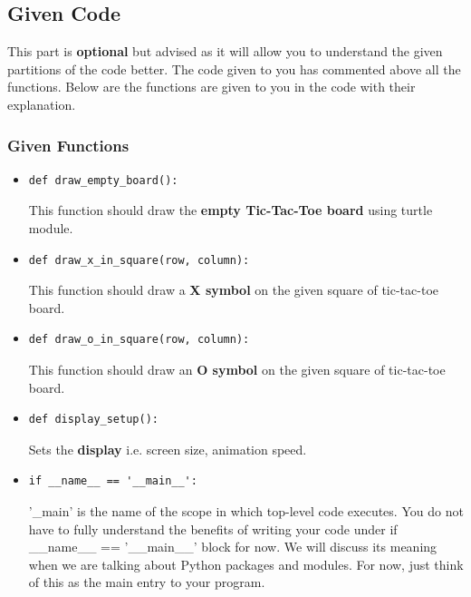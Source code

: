 \documentclass[a4paper]{article}
\begin{document}
\subsection{Given Code}
This part is \textbf{optional} but advised as it will allow you to understand the given partitions of the code better. The code given to you has commented above all the functions. Below are the functions are given to you in the code with their explanation.

\newpage
\subsubsection{Given Functions}
\label{themeMethod}
\begin{itemize}


\item
\begin{lstlisting}
def draw_empty_board():
\end{lstlisting}
This function should draw the \textbf{empty Tic-Tac-Toe board} using turtle module.

\item
\begin{lstlisting}
def draw_x_in_square(row, column):
\end{lstlisting}
This function should draw a \textbf{X symbol} on the given square of tic-tac-toe board.

\item
\begin{lstlisting}
def draw_o_in_square(row, column):
\end{lstlisting}
This function should draw an \textbf{O symbol} on the given square of tic-tac-toe board.

\item
\begin{lstlisting}
def display_setup():
\end{lstlisting}
Sets the \textbf{display} i.e. screen size, animation speed.

\item
\begin{lstlisting}
if __name__ == '__main__':
\end{lstlisting}
'\_main' is the name of the scope in which top-level code executes. You do not have to fully understand the benefits of writing your code under if \_\_name\_\_ == '\_\_main\_\_' block for now. We will discuss its meaning when we are talking about Python packages and modules. For now, just think of this as the main entry to your program.


\end{itemize}
\end{document}
